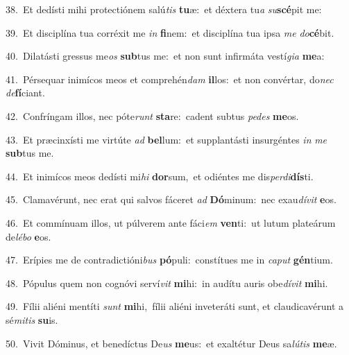 {\numbfont\textcolor{\numbcolor}{38.}}~Et dedísti mihi protectiónem salú\textit{tis} \textbf{tu}\-æ:~\star et déxtera tu\textit{a} \textit{su}\-\textbf{scé}pit me:\par
{\numbfont\textcolor{\numbcolor}{39.}}~Et disciplína tua corréxit me \textit{in} \textbf{fi}\-nem:~\star et disciplína tua ipsa \textit{me} \textit{do}\-\textbf{cé}bit.\par
{\numbfont\textcolor{\numbcolor}{40.}}~Dilatásti gressus me\textit{os} \textbf{sub}\-tus me:~\star et non sunt infirmáta vestí\-\textit{gi}\-\textit{a} \textbf{me}\-a:\par
{\numbfont\textcolor{\numbcolor}{41.}}~Pérsequar inimícos meos et comprehén\textit{dam} \textbf{il}\-los:~\star et non convértar, do\textit{nec} \textit{de}\-\textbf{fí}ciant.\par
{\numbfont\textcolor{\numbcolor}{42.}}~Confríngam illos, nec póte\textit{runt} \textbf{sta}\-re:~\star cadent subtus \textit{pe}\-\textit{des} \textbf{me}\-os.\par
{\numbfont\textcolor{\numbcolor}{43.}}~Et præcinxísti me virtúte \textit{ad} \textbf{bel}\-lum:~\star et supplantásti insurgéntes \textit{in} \textit{me} \textbf{sub}\-tus me.\par
{\numbfont\textcolor{\numbcolor}{44.}}~Et inimícos meos dedísti mi\textit{hi} \textbf{dor}\-sum,~\star et odiéntes me dis\-\textit{per}\-\textit{di}\textbf{dís}ti.\par
{\numbfont\textcolor{\numbcolor}{45.}}~Clamavérunt, nec erat qui salvos fáceret \textit{ad} \textbf{Dó}\-minum:~\star nec exau\-\textit{dí}\-\textit{vit} \textbf{e}\-os.\par
{\numbfont\textcolor{\numbcolor}{46.}}~Et commínuam illos, ut púlverem ante fáci\textit{em} \textbf{ven}\-ti:~\star ut lutum plateárum de\-\textit{lé}\-\textit{bo} \textbf{e}\-os.\par
{\numbfont\textcolor{\numbcolor}{47.}}~Erípies me de contradictióni\textit{bus} \textbf{pó}\-puli:~\star constítues me in \textit{ca}\-\textit{put} \textbf{gén}\-tium.\par
{\numbfont\textcolor{\numbcolor}{48.}}~Pópulus quem non cognóvi serví\textit{vit} \textbf{mi}\-hi:~\star in audítu auris obe\-\textit{dí}\-\textit{vit} \textbf{mi}\-hi.\par
{\numbfont\textcolor{\numbcolor}{49.}}~Fílii aliéni mentíti \textit{sunt} \textbf{mi}\-hi,~\star fílii aliéni inveteráti sunt, et claudicavérunt a sé\-\textit{mi}\-\textit{tis} \textbf{su}\-is.\par
{\numbfont\textcolor{\numbcolor}{50.}}~Vivit Dóminus, et benedíctus De\textit{us} \textbf{me}\-us:~\star et exaltétur Deus sa\-\textit{lú}\-\textit{tis} \textbf{me}\-æ.\par
